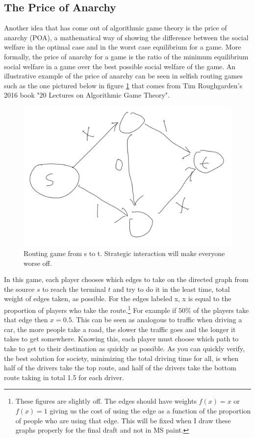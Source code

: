 \documentclass[12pt,twoside]{reedthesis}
\begin{document}
\subsection{The Price of Anarchy}
Another idea that has come out of algorithmic game theory is the price of anarchy (POA), a mathematical way of showing the difference between the social welfare in the optimal case and in the worst case equilibrium for a game. More formally, the price of anarchy for a game is the ratio of the minimum equilibrium social welfare in a game over the best possible social welfare of the game. An illustrative example of the price of anarchy can be seen in selfish routing games such as the one pictured below in figure \ref{braess} that comes from Tim Roughgarden's 2016 book "20 Lectures on Algorithmic Game Theory". 
\begin{figure}[h!]
	\centering
	\includegraphics[scale=0.4]{braess}
	\caption{Routing game from s to t. Strategic interaction will make everyone worse off.}
	\label{braess}
\end{figure}
In this game, each player chooses which edges to take on the directed graph from the source $s$ to reach the terminal $t$ and try to do it in the least time, total weight of edges taken, as possible. For the edges labeled x, x is equal to the proportion of players who take the route.\footnote{These figures are slightly off. The edges should have weights $f(x) = x$ or $f(x) = 1$ giving us the cost of using the edge as a function of the proportion of people who are using that edge. This will be fixed when I draw these graphs properly for the final draft and not in MS paint.} For example if $50 \%$ of the players take that edge then $x=0.5$. This can be seen as analogous to traffic when driving a car, the more people take a road, the slower the traffic goes and the longer it takes to get somewhere. Knowing this, each player must choose which path to take to get to their destination as quickly as possible. As you can quickly verify, the best solution for society, minimizing the total driving time for all, is when half of the drivers take the top route, and half of the drivers take the bottom route taking in total 1.5 for each driver. 
\end{document}
